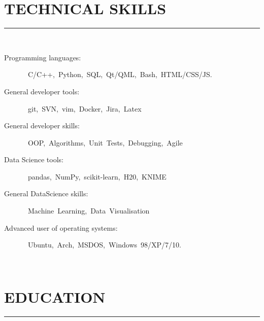 \documentclass[a4paper,oneside,12pt]{article}
\newcommand{\cvpart}[1]{%
\vspace{-1em}%
\section*{\Large\bfseries\MakeTextUppercase{#1}}%
\vspace{-1em}%
\rule{\linewidth}{0.3em}\\[-.3em]%
}
\begin{document}


\cvpart{Technical skills}
\begin{description}
\item[Programming languages:]~C/C++,~Python,~SQL,~Qt/QML,~Bash,~HTML/CSS/JS.
\item[General developer tools:]~git,~SVN,~vim,~Docker,~Jira,~Latex
\item[General developer skills:]~OOP,~Algorithms,~Unit~Tests,~Debugging,~Agile
\item[Data Science tools: ]~pandas,~NumPy,~scikit-learn,~H{\footnotesize 2}0,~KNIME
\item[General DataScience skills:] ~Machine~Learning,~Data~Visualisation
\item[Advanced user of operating systems:]~Ubuntu,~Arch,~MSDOS,~Windows~98/XP/7/10.
\end{description}

~\\

\cvpart{Education}
\end{document}
